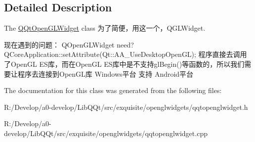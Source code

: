 \subsection{Detailed Description}
The \mbox{\hyperlink{class_q_qt_open_g_l_widget}{Q\+Qt\+Open\+G\+L\+Widget}} class 为了简便，用这一个，\+Q\+G\+L\+Widget. 

现在遇到的问题： Q\+Open\+G\+L\+Widget need? Q\+Core\+Application\+::set\+Attribute(\+Qt\+::\+A\+A\+\_\+\+Use\+Desktop\+Open\+G\+L); 程序直接去调用了\+Open\+GL E\+S库，而在\+Open\+GL E\+S库中是不支持gl\+Begin()等函数的，所以我们需要让程序去连接到\+Open\+G\+L库 Windows平台 支持 Android平台 

The documentation for this class was generated from the following files\+:\begin{DoxyCompactItemize}
\item 
R\+:/\+Develop/a0-\/develop/\+Lib\+Q\+Qt/src/exquisite/openglwidgets/qqtopenglwidget.\+h\item 
R\+:/\+Develop/a0-\/develop/\+Lib\+Q\+Qt/src/exquisite/openglwidgets/qqtopenglwidget.\+cpp\end{DoxyCompactItemize}
